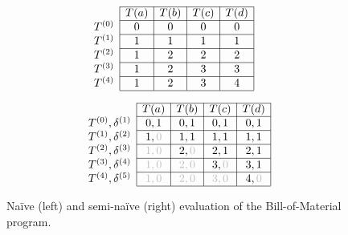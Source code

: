 \begin{figure*}
  \begin{subfigure}{0.47\linewidth}
\begin{align*}
 &
   \begin{array}{l|c|c|c|c|} \cline{2-5}
     &T(a)&T(b)&T(c)&T(d) \\ \cline{2-5}
     T^{(0)} & 0 & 0 & 0 & 0  \\ \cline{2-5}
     T^{(1)} & 1 & 1 & 1 & 1  \\ \cline{2-5}
     T^{(2)} & 1 & 2 & 2 & 2  \\ \cline{2-5}
     T^{(3)} & 1 & 2 & 3 & 3  \\ \cline{2-5}
     T^{(4)} & 1 & 2 & 3 & 4  \\ \cline{2-5}
     \end{array}
\end{align*}
  \end{subfigure}
  \begin{subfigure}{0.47\linewidth}
\begin{align*}
 \begin{array}{l|c|c|c|c|} \cline{2-5}
   &T(a)&T(b)&T(c)&T(d) \\ \cline{2-5}
   T^{(0)}, \delta^{(1)} & 0, 1 & 0, 1 & 0, 1 & 0, 1  \\ \cline{2-5}
   T^{(1)}, \delta^{(2)} & 1, \textcolor{lightgray}{0} & 1, 1 & 1, 1 & 1, 1 \\ \cline{2-5}
   T^{(2)}, \delta^{(3)} & \textcolor{lightgray}{1, 0} & 2, \textcolor{lightgray}{0} & 2, 1 & 2, 1 \\ \cline{2-5}
   T^{(3)}, \delta^{(4)} & \textcolor{lightgray}{1, 0} & \textcolor{lightgray}{2, 0} & 3, \textcolor{lightgray}{0} & 3, 1  \\ \cline{2-5}
   T^{(4)}, \delta^{(5)} & \textcolor{lightgray}{1, 0} & \textcolor{lightgray}{2, 0} & \textcolor{lightgray}{3, 0} & 4, \textcolor{lightgray}{0} \\ \cline{2-5}
   \end{array}
\end{align*}
  \end{subfigure}
\caption{Na\"ive (left) and semi-na\"ive (right) evaluation of the Bill-of-Material program.}
\label{fig:bom}
\end{figure*}


